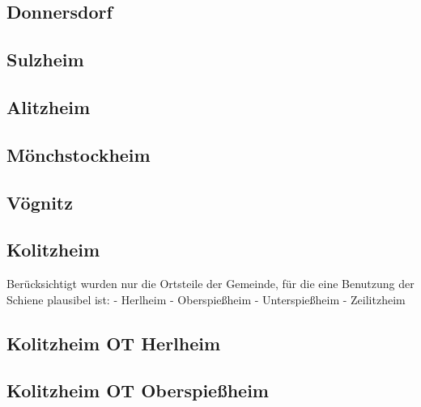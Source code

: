 \documentclass[fontsize=12pt,a4paper]{scrreprt}
\begin{document}
            \subsection{Donnersdorf}
            

            \subsection{Sulzheim}
            

            \subsection{Alitzheim}
            

            \subsection{Mönchstockheim}
            

            \subsection{Vögnitz}
            

            \subsection{Kolitzheim}
            Berücksichtigt wurden nur die Ortsteile der Gemeinde, für die eine Benutzung der Schiene plausibel ist:
            - Herlheim\newline
            - Oberspießheim\newline
            - Unterspießheim\newline
            - Zeilitzheim

            \subsection{Kolitzheim OT Herlheim}
            

            \subsection{Kolitzheim OT Oberspießheim}
            
\end{document}
